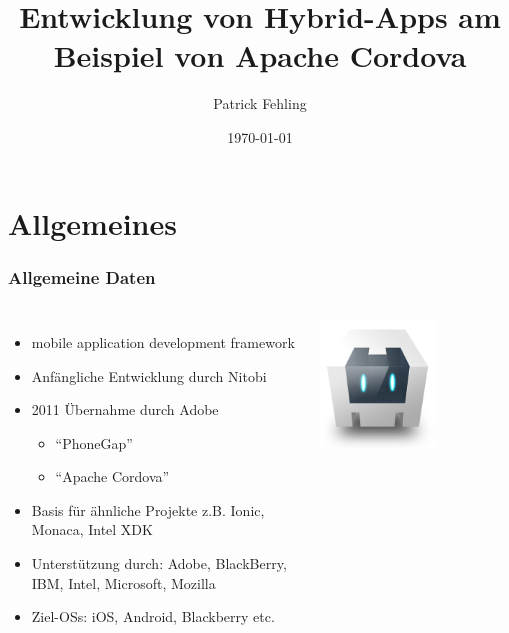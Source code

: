 \documentclass[xcolor=dvipsnames]{beamer}
\title[Entwicklung von Hybrid-Apps am Beispiel von Apache Cordova]{Entwicklung von Hybrid-Apps am Beispiel von Apache Cordova}
\author{Patrick Fehling}
\institute{Hochschule für Technik und Wirtschaft Berlin}
\date{\today}
\begin{document}
\maketitle
\frame{\tableofcontents}


\section{Allgemeines}

\begin{frame}\frametitle{Allgemeine Daten}
	\begin{columns}[t,onlytextwidth]
		\begin{itemize}
			\item mobile application development framework
			\item Anfängliche Entwicklung durch Nitobi
			\item 2011 Übernahme durch Adobe
			\begin{itemize}
				\item "`PhoneGap"'
				\item "`Apache Cordova"'
			\end{itemize}
			\item Basis für ähnliche Projekte z.B. Ionic, Monaca, Intel XDK
			\item Unterstützung durch: Adobe, BlackBerry, IBM, Intel, Microsoft, Mozilla
			\item Ziel-OSs: iOS, Android, Blackberry etc.
		\end{itemize}
		\centering
		
		\includegraphics[width=0.6\textwidth]{pictures/cordova_logo}
		

\end{columns}
\end{frame}
\end{document}
